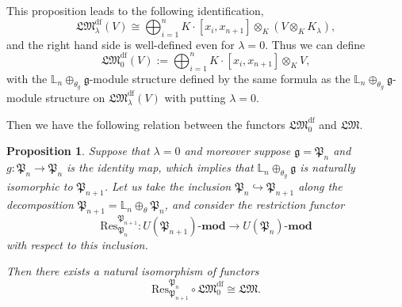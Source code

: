 \documentclass[a4paper,12pt]{article}
\newtheorem{prop}[thm]{Proposition}
\theoremstyle{definition}
\theoremstyle{remark}
\begin{document}
This proposition leads to the following identification,
\[
	\mathfrak{LM}^{\mathrm{df}}_{\lambda}(V)\cong \bigoplus_{i=1}^{n} K\cdot  [x_{i},x_{n+1}] \otimes_{K} (V\otimes_{K} K_{\lambda}),
\]
and the right hand side is well-defined even for $\lambda=0$.
Thus we can 
define 
\[
	\mathfrak{LM}^{\mathrm{df}}_{0}(V):=\bigoplus_{i=1}^{n} K\cdot  [x_{i},x_{n+1}] \otimes_{K} V,
\]
with the $\mathbb{L}_{n}\oplus_{\theta_{g}} \mathfrak{g}$-module structure 
defined by the same formula as the $\mathbb{L}_{n}\oplus_{\theta_{g}} \mathfrak{g}$-module structure on $\mathfrak{LM}^{\mathrm{df}}_{\lambda}(V)$
with putting $\lambda=0$.

Then we have the following relation between the functors $\mathfrak{LM}^{\mathrm{df}}_{0}$ and $\mathfrak{LM}$.
\begin{prop}\label{prop:compLM}
Suppose that $\lambda=0$ and moreover suppose $\mathfrak{g}=\mathfrak{P}_{n}$
and $g\colon \mathfrak{P}_{n}\rightarrow \mathfrak{P}_{n}$ is the 
identity map, which implies that 
$\mathbb{L}_{n}\oplus_{\theta_{g}} \mathfrak{g}$
is naturally isomorphic to $\mathfrak{P}_{n+1}$.
Let us take the inclusion 
$\mathfrak{P}_{n}\hookrightarrow \mathfrak{P}_{n+1}$
along the decomposition 
$\mathfrak{P}_{n+1}=\mathbb{L}_{n}\oplus_{\theta}\mathfrak{P}_{n}$,
and consider the restriction functor 
\[
	\mathrm{Res}_{\mathfrak{P}_{n}}^{\mathfrak{P}_{n+1}}
	\colon U(\mathfrak{P}_{n+1})\text{-}\mathbf{mod}
	\longrightarrow U(\mathfrak{P}_{n})\text{-}\mathbf{mod}
\]
with respect to this inclusion. 

Then there exists a natural isomorphism of functors
\[	
\mathrm{Res}^{\mathfrak{P}_{n}}_{\mathfrak{P}_{n+1}}\circ \mathfrak{LM}^{\mathrm{df}}_{0}\cong \mathfrak{LM}.
\]
\end{prop}
\end{document}
